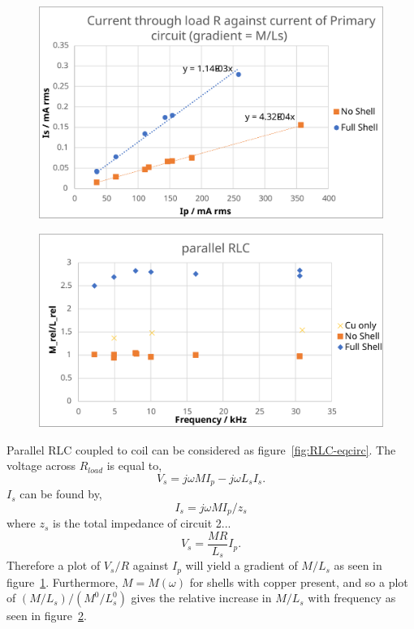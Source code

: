 \documentclass[11pt]{iopart}
\begin{document}
\begin{figure}
  \begin{center}
   \noindent\includegraphics[width=0.75\linewidth]{images/Is_vs_Ip_RLC.pdf}
  \label{fig:RLC-IvI}
  \end{center}
  \caption{}
\end{figure}

\begin{figure}
  \begin{center}
   \noindent\includegraphics[width=0.75\linewidth]{images/parallel_RLC_Mrel.pdf}
  \label{fig:RLC-Mrel}
  \end{center}
  \caption{}
\end{figure}

Parallel RLC coupled to coil can be considered as
figure~\ref{fig:RLC-eqcirc}.  The voltage across $R_{load}$ is equal
to,
$$ V_s = j\omega MI_p - j\omega L_sI_s.$$
$I_s$ can be found by,
$$ I_s = j\omega MI_p / z_s $$
where $z_s$ is the total impedance of circuit 2...
$$ V_s = \frac{MR}{L_s}I_p. $$
Therefore a plot of $V_s / R$ against $I_p$ will yield a gradient of
$M/L_s$ as seen in figure~\ref{fig:RLC-IvI}.  Furthermore, $M =
M(\omega)$ for shells with copper present, and so a plot of
$(M/L_s)/(M^0/L_s^0)$ gives the relative increase in $M/L_s$ with
frequency as seen in figure~\ref{fig:RLC-Mrel}.\\
\end{document}
